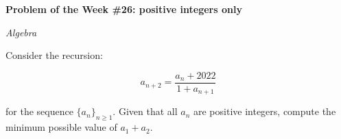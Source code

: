 \begin{potw}\vspace{5pt}
{\large\textbf{Problem of the Week \#26: positive integers only}}\vspace{5pt}

\textit{Algebra}\V

Consider the recursion: 

\[a_{n+2} = \frac{a_n + 2022}{1+a_{n+1}}\]

for the sequence $\{a_n\}_{n\geq 1}$. Given that all $a_n$ are positive integers, compute the minimum possible value of $a_1+a_2$.
\end{potw}\V

